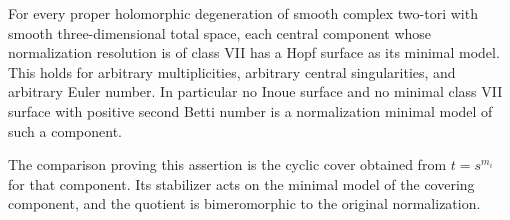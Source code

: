 
\begin{proposition}\label{cdp:st:C.2.UN.19}
For every proper holomorphic degeneration of smooth complex
two-tori with smooth three-dimensional total space, each
central component whose normalization resolution is of class
VII has a Hopf surface as its minimal model. This holds for
arbitrary multiplicities, arbitrary central singularities,
and arbitrary Euler number. In particular no Inoue surface
and no minimal class VII surface with positive second Betti
number is a normalization minimal model of such a component.

The comparison proving this assertion is the cyclic cover
obtained from $t=s^{m_i}$ for that component. Its stabilizer
acts on the minimal model of the covering component, and
the quotient is bimeromorphic to the original normalization.
\end{proposition}

